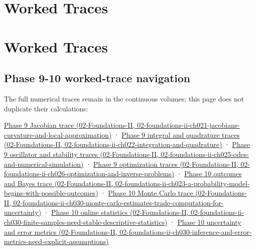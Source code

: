 \hypertarget{appendix-92ff77d4dfdc}{}
\section*{Worked Traces}
\section{Worked Traces}\label{appendix-92ff77d4dfdc-worked-traces}

\subsection{Phase 9-10 worked-trace navigation}\label{appendix-92ff77d4dfdc-phase-9-10-worked-trace-navigation}

The full numerical traces remain in the continuous volumes; this page does not duplicate their calculations:

\href{../02-Foundations-II/main.pdf\#nameddest=02-foundations-ii-ch021-jacobians-curvature-and-local-approximation}{Phase 9 Jacobian trace (02-Foundations-II, 02-foundations-ii-ch021-jacobians-curvature-and-local-approximation)} · \href{../02-Foundations-II/main.pdf\#nameddest=02-foundations-ii-ch022-integration-and-quadrature}{Phase 9 integral and quadrature traces (02-Foundations-II, 02-foundations-ii-ch022-integration-and-quadrature)} · \href{../02-Foundations-II/main.pdf\#nameddest=02-foundations-ii-ch025-odes-and-numerical-simulation}{Phase 9 oscillator and stability traces (02-Foundations-II, 02-foundations-ii-ch025-odes-and-numerical-simulation)} · \href{../02-Foundations-II/main.pdf\#nameddest=02-foundations-ii-ch026-optimization-and-inverse-problems}{Phase 9 optimization traces (02-Foundations-II, 02-foundations-ii-ch026-optimization-and-inverse-problems)} · \href{../02-Foundations-II/main.pdf\#nameddest=02-foundations-ii-ch023-a-probability-model-begins-with-possible-outcomes}{Phase 10 outcomes and Bayes trace (02-Foundations-II, 02-foundations-ii-ch023-a-probability-model-begins-with-possible-outcomes)} · \href{../02-Foundations-II/main.pdf\#nameddest=02-foundations-ii-ch030-monte-carlo-estimates-trade-computation-for-uncertainty}{Phase 10 Monte Carlo trace (02-Foundations-II, 02-foundations-ii-ch030-monte-carlo-estimates-trade-computation-for-uncertainty)} · \href{../02-Foundations-II/main.pdf\#nameddest=02-foundations-ii-ch030-finite-samples-need-stable-descriptive-statistics}{Phase 10 online statistics (02-Foundations-II, 02-foundations-ii-ch030-finite-samples-need-stable-descriptive-statistics)} · \href{../02-Foundations-II/main.pdf\#nameddest=02-foundations-ii-ch030-inference-and-error-metrics-need-explicit-assumptions}{Phase 10 uncertainty and error metrics (02-Foundations-II, 02-foundations-ii-ch030-inference-and-error-metrics-need-explicit-assumptions)}

